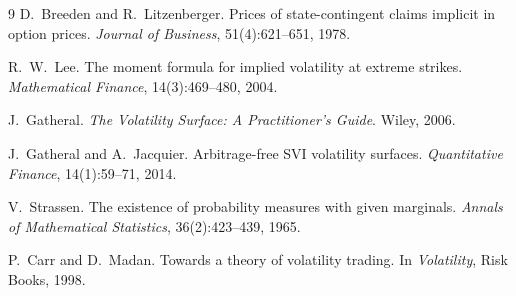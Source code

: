 \documentclass[11pt]{article}
\begin{document}
\begin{thebibliography}{9}
D.~Breeden and R.~Litzenberger.
Prices of state-contingent claims implicit in option prices.
\emph{Journal of Business}, 51(4):621--651, 1978.

R.~W.~Lee.
The moment formula for implied volatility at extreme strikes.
\emph{Mathematical Finance}, 14(3):469--480, 2004.

J.~Gatheral.
\emph{The Volatility Surface: A Practitioner's Guide}.
Wiley, 2006.

J.~Gatheral and A.~Jacquier.
Arbitrage-free SVI volatility surfaces.
\emph{Quantitative Finance}, 14(1):59--71, 2014.

V.~Strassen.
The existence of probability measures with given marginals.
\emph{Annals of Mathematical Statistics}, 36(2):423--439, 1965.

P.~Carr and D.~Madan.
Towards a theory of volatility trading.
In \emph{Volatility}, Risk Books, 1998.
\end{thebibliography}
\end{document}
